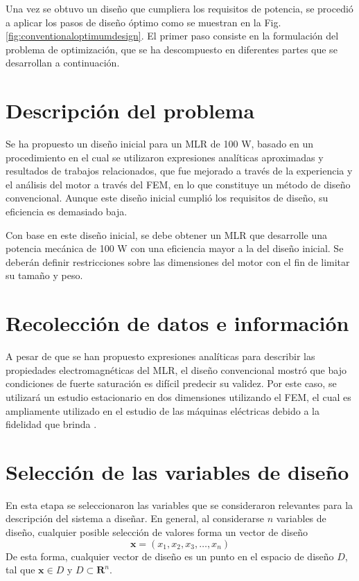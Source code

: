 Una vez se obtuvo un diseño que cumpliera los requisitos de potencia, se procedió a aplicar los pasos de diseño óptimo como se muestran en la Fig. \ref{fig:conventionaloptimumdesign}. El primer paso consiste en la formulación del problema de optimización, que se ha descompuesto en diferentes partes que se desarrollan a continuación.

\section{Descripción del problema}
Se ha propuesto un diseño inicial para un MLR de 100 W, basado en un procedimiento en el cual se utilizaron expresiones analíticas aproximadas y resultados de trabajos relacionados, que fue mejorado a través de la experiencia y el análisis del motor a través del FEM, en lo que constituye un método de diseño convencional. Aunque este diseño inicial cumplió los requisitos de diseño, su eficiencia es demasiado baja.

Con base en este diseño inicial, se debe obtener un MLR que desarrolle una potencia mecánica de 100 W con una eficiencia mayor a la del diseño inicial. Se deberán definir restricciones sobre las dimensiones del motor con el fin de limitar su tamaño y peso.

\section{Recolección de datos e información}
A pesar de que se han propuesto expresiones analíticas para describir las propiedades electromagnéticas del MLR, el diseño convencional mostró que bajo condiciones de fuerte saturación es difícil predecir su validez. Por este caso, se utilizará un estudio estacionario en dos dimensiones utilizando el FEM, el cual es ampliamente utilizado en el estudio de las máquinas eléctricas debido a la fidelidad que brinda \cite{bianchi2011,boldea2015,gudelhofer2012,agarlita2013}.

\section{Selección de las variables de diseño}

En esta etapa se seleccionaron las variables que se consideraron relevantes para la descripción del sistema a diseñar. En general, al considerarse $n$ variables de diseño, cualquier posible selección de valores forma un vector de diseño
\begin{equation*}
\mathbf{x}=
(x_1, x_2, x_3, \ldots, x_n)
\end{equation*}
De esta forma, cualquier vector de diseño es un punto en el espacio de diseño $D$, tal que $\mathbf{x}\in D$ y $D \subset \mathbf{R}^n$.

